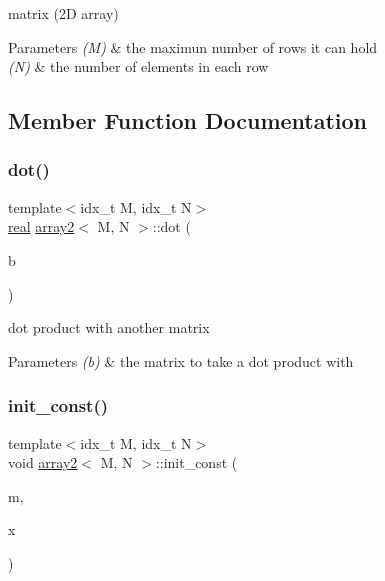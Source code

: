 matrix (2D array) 


\begin{DoxyParams}{Parameters}
{\em (\+M)} & the maximun number of rows it can hold \\
\hline
{\em (\+N)} & the number of elements in each row \\
\hline
\end{DoxyParams}


\subsection{Member Function Documentation}
\mbox{\label{structarray2_a7cef3c020d1441b8665e20e048d14c13}} 
\subsubsection{\texorpdfstring{dot()}{dot()}}
{\footnotesize\ttfamily template$<$idx\+\_\+t M, idx\+\_\+t N$>$ \\
\hyperlink{vgg__util_8h_a1082d08aaa761215ec83e7149f27ad16}{real} \hyperlink{structarray2}{array2}$<$ M, N $>$\+::dot (\begin{DoxyParamCaption}\item[{\hyperlink{structarray2}{array2}$<$ M, N $>$ \&}]{b }\end{DoxyParamCaption})\hspace{0.3cm}{\ttfamily [inline]}}



dot product with another matrix 


\begin{DoxyParams}{Parameters}
{\em (b)} & the matrix to take a dot product with \\
\hline
\end{DoxyParams}
\mbox{\label{structarray2_a4a4af5c54d1e18ef867abe8a9e6b8226}} 
\subsubsection{\texorpdfstring{init\+\_\+const()}{init\_const()}}
{\footnotesize\ttfamily template$<$idx\+\_\+t M, idx\+\_\+t N$>$ \\
void \hyperlink{structarray2}{array2}$<$ M, N $>$\+::init\+\_\+const (\begin{DoxyParamCaption}\item[{\hyperlink{vgg__util_8h_a8e93478a00e685bea5e6a3f617bf03a3}{idx\+\_\+t}}]{m,  }\item[{\hyperlink{vgg__util_8h_a1082d08aaa761215ec83e7149f27ad16}{real}}]{x }\end{DoxyParamCaption})\hspace{0.3cm}{\ttfamily [inline]}}



